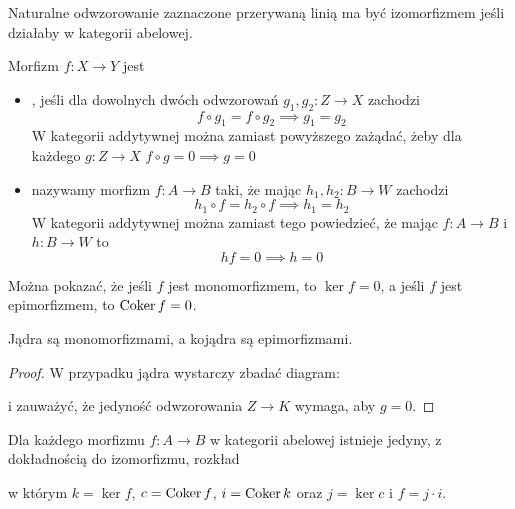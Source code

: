 \begin{itemize}
    \begin{center}\end{center}
    Naturalne odwzorowanie zaznaczone przerywaną linią ma być izomorfizmem jeśli działaby w kategorii abelowej.
\end{itemize}

\begin{definition}
  Morfizm $f:X\to Y$ jest
  \begin{itemize}
    \item {}, jeśli dla dowolnych dwóch odwzorowań $g_1,g_2:Z\to X$ zachodzi
      $$f\circ g_1=f\circ g_2\implies g_1=g_2$$
      W kategorii addytywnej można zamiast powyższego zażądać, żeby dla każdego $g:Z\to X$ $f\circ g=0\implies g=0$
    \item {} nazywamy morfizm $f:A\to B$ taki, że mając $h_1,h_2:B\to W$ zachodzi
      $$h_1\circ f=h_2\circ f\implies h_1=h_2$$
      W kategorii addytywnej można zamiast tego powiedzieć, że mając $f:A\to B$ i $h:B\to W$ to
      $$hf=0\implies h=0$$
  \end{itemize}
\end{definition}

Można pokazać, że jeśli $f$ jest monomorfizmem, to $\ker f=0$, a jeśli $f$ jest epimorfizmem, to $\operatorname{Coker} f=0$.

\begin{lemma}
  Jądra są monomorfizmami, a kojądra są epimorfizmami.
\end{lemma}

\begin{proof}
  W przypadku jądra wystarczy zbadać diagram:
  \begin{center}\end{center}
  i zauważyć, że jedyność odwzorowania $Z\to K$ wymaga, aby $g=0$.
\end{proof}

\begin{uwaga}\label{uwaga 5.1}
  Dla każdego morfizmu $f:A\to B$ w kategorii abelowej istnieje jedyny, z dokładnością do izomorfizmu, rozkład
  
  \begin{center}\end{center}
  
  w którym $k=\ker f$, $c=\operatorname{Coker} f$, $i=\operatorname{Coker} k$ oraz $j=\ker c$ i $f=j\cdot i$.
\end{uwaga}

